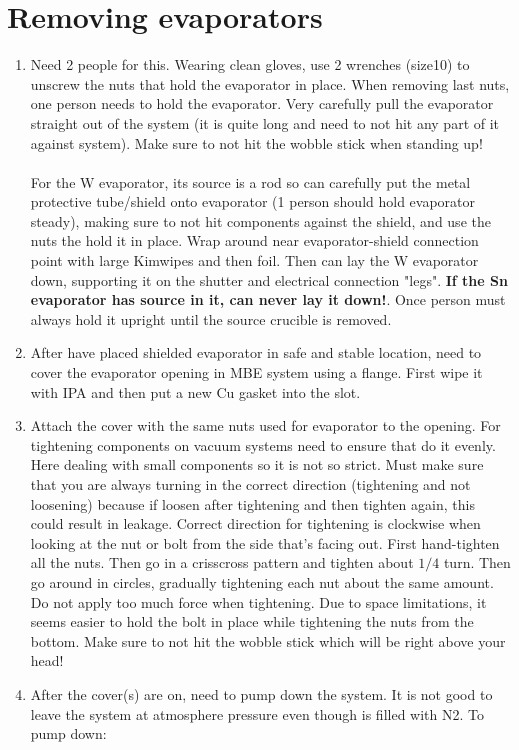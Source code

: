 \section{Removing evaporators}
\begin{enumerate}
\item	Need 2 people for this. Wearing clean gloves, use 2 wrenches (size10) to unscrew the nuts that hold the evaporator in place. When removing last nuts, one person needs to hold the evaporator. Very carefully pull the evaporator straight out of the system (it is quite long and need to not hit any part of it against system). Make sure to not hit the wobble stick when standing up! \\\\
For the W evaporator, its source is a rod so can carefully put the metal protective tube/shield onto evaporator (1 person should hold evaporator steady), making sure to not hit components against the shield, and use the nuts the hold it in place. Wrap around near evaporator-shield connection point with large Kimwipes and then foil. Then can lay the W evaporator down, supporting it on the shutter and electrical connection "legs". \textbf{If the Sn evaporator has source in it, can never lay it down!}. Once person must always hold it upright until the source crucible is removed.
\item	After have placed shielded evaporator in safe and stable location, need to cover the evaporator opening in MBE system using a flange.  First wipe it with IPA and then put a new Cu gasket into the slot. 
\item	Attach the cover with the same nuts used for evaporator to the opening. For tightening components on vacuum systems need to ensure that do it evenly. Here dealing with small components so it is not so strict. Must make sure that you are always turning in the correct direction (tightening and not loosening) because if loosen after tightening and then tighten again, this could result in leakage. Correct direction for tightening is clockwise when looking at the nut or bolt from the side that’s facing out. First hand-tighten all the nuts. Then go in a crisscross pattern and tighten about $1/4$ turn. Then go around in circles, gradually tightening each nut about the same amount. Do not apply too much force when tightening. Due to space limitations, it seems easier to hold the bolt in place while tightening the nuts from the bottom. Make sure to not hit the wobble stick which will be right above your head!
\item	 After the cover(s) are on, need to pump down the system. It is not good to leave the system at atmosphere pressure even though is filled with N2. To pump down:

\end{enumerate}
